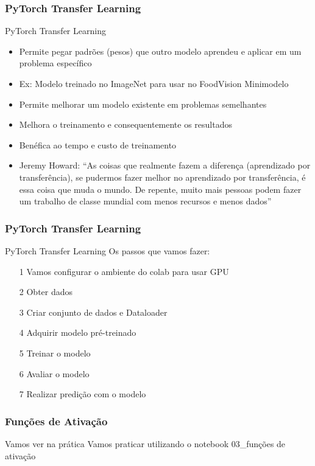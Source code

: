\documentclass{beamer}
\begin{document}
\begin{frame}
	\frametitle{PyTorch Transfer Learning}
	\begin{block}{PyTorch Transfer Learning}
		\begin{itemize}
			\item Permite pegar padrões (pesos) que outro modelo aprendeu e aplicar em um problema específico
			\item Ex: Modelo treinado no ImageNet para usar no FoodVision Minimodelo
			\item Permite melhorar um modelo existente em problemas semelhantes
			\item Melhora o treinamento e consequentemente os resultados
			\item Benéfica ao tempo e custo de treinamento
			\item Jeremy Howard: ``As coisas que realmente fazem a diferença (aprendizado por transferência), se pudermos fazer melhor no aprendizado por transferência, é essa coisa que muda o mundo. De repente, muito mais pessoas podem fazer um trabalho de classe mundial com menos recursos e menos dados''
		\end{itemize}
	\end{block}
\end{frame}    
\begin{frame}
	\frametitle{PyTorch Transfer Learning}
	\begin{block}{PyTorch Transfer Learning}
		Os passos que vamos fazer:
		\begin{itemize}
			\item[1] Vamos configurar o ambiente do colab para usar GPU
			\item[2] Obter dados
			\item[3] Criar conjunto de dados e Dataloader
			\item[4] Adquirir modelo pré-treinado
			\item[5] Treinar o modelo
			\item[6] Avaliar o modelo
			\item[7] Realizar predição com o modelo
		\end{itemize}
	\end{block}
\end{frame}    
\begin{frame}
	\frametitle{Funções de Ativação}
	\begin{block}{Vamos ver na prática}
		Vamos praticar utilizando o notebook 03\_funções de ativação
	\end{block}
\end{frame}
\end{document}
